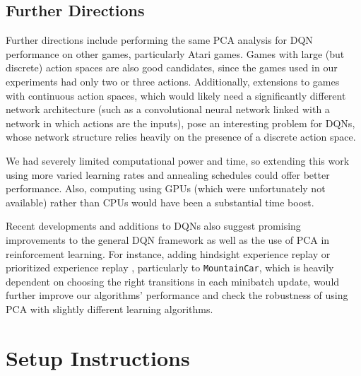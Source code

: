 \documentclass[11pt]{article}
\newcommand{\mc}{\texttt{MountainCar}}
\begin{document}
\subsection{Further Directions}

Further directions include performing the same PCA analysis for DQN performance on other games, particularly Atari games. Games with large (but discrete) action spaces are also good candidates, since the games used in our experiments had only two or three actions. Additionally, extensions to games with continuous action spaces, which would likely need a significantly different network architecture (such as a convolutional neural network linked with a network in which actions are the inputs), pose an interesting problem for DQNs, whose network structure relies heavily on the presence of a discrete action space.

We had severely limited computational power and time, so extending this work using more varied learning rates and annealing schedules could offer better performance. Also, computing using GPUs (which were unfortunately not available) rather than CPUs would have been a substantial time boost.

Recent developments and additions to DQNs also suggest promising improvements to the general DQN framework as well as the use of PCA in reinforcement learning. For instance, adding hindsight experience replay \cite{andrychowicz2017hindsight} or prioritized experience replay \cite{schaul2015prioritized}, particularly to \mc, which is heavily dependent on choosing the right transitions in each minibatch update, would further improve our algorithms' performance and check the robustness of using PCA with slightly different learning algorithms.

\newpage
{}


\onecolumn

\appendix

\section{Setup Instructions}
\label{app:getting_started}
\end{document}
